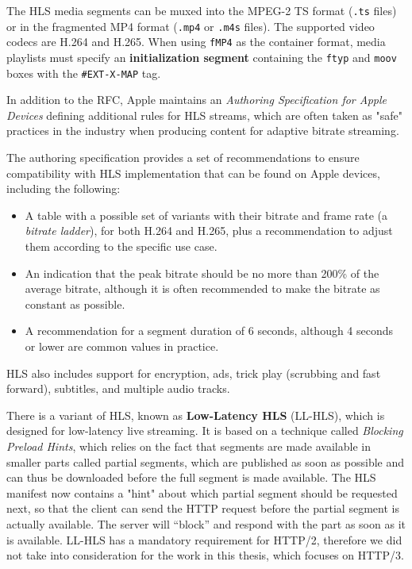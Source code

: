 The HLS media segments can be muxed into the MPEG-2 TS format (\texttt{.ts} files) or in the fragmented MP4 format (\texttt{.mp4} or \texttt{.m4s} files). The supported video codecs are H.264 and H.265. When using \texttt{fMP4} as the container format, media playlists must specify an \textbf{initialization segment} containing the \texttt{ftyp} and \texttt{moov} boxes with the \texttt{\#EXT-X-MAP} tag.

In addition to the RFC, Apple maintains an \textit{Authoring Specification for Apple Devices} defining additional rules for HLS streams, which are often taken as "safe" practices in the industry when producing content for adaptive bitrate streaming.\cite{hlsauthoring}

The authoring specification provides a set of recommendations to ensure compatibility with HLS implementation that can be found on Apple devices, including the following:

\begin{itemize}
    \item A table with a possible set of variants with their bitrate and frame rate (a \textit{bitrate ladder}), for both H.264 and H.265, plus a recommendation to adjust them according to the specific use case.
    \item An indication that the peak bitrate should be no more than 200\% of the average bitrate, although it is often recommended to make the bitrate as constant as possible.\cite{ozer}
    \item A recommendation for a segment duration of 6 seconds, although 4 seconds or lower are common values in practice.\cite{ozer}
\end{itemize}

HLS also includes support for encryption, ads, trick play (scrubbing and fast forward), subtitles, and multiple audio tracks.

There is a variant of HLS, known as \textbf{Low-Latency HLS} (LL-HLS), which is designed for low-latency live streaming. It is based on a technique called \textit{Blocking Preload Hints}, which relies on the fact that segments are made available in smaller parts called partial segments, which are published as soon as possible and can thus be downloaded before the full segment is made available. The HLS manifest now contains a "hint" about which partial segment should be requested next, so that the client can send the HTTP request before the partial segment is actually available. The server will “block” and respond with the part as soon as it is available. LL-HLS has a mandatory requirement for HTTP/2, therefore we did not take into consideration for the work in this thesis, which focuses on HTTP/3.

